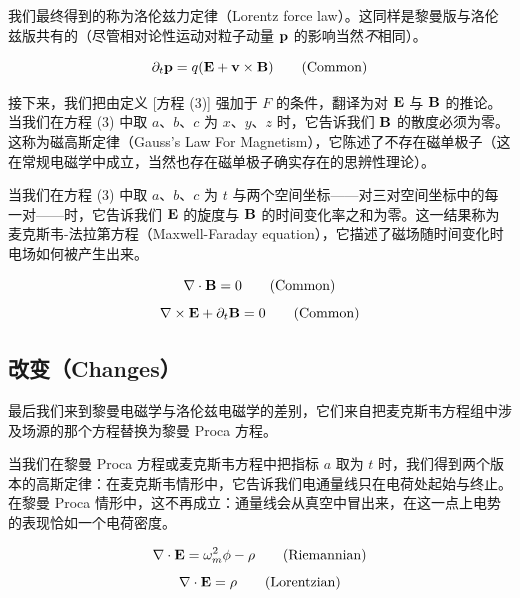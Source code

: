我们最终得到的称为洛伦兹力定律（Lorentz force law）。这同样是黎曼版与洛伦兹版共有的（尽管相对论性运动对粒子动量 $\mathbf{p}$ 的影响当然\emph{不}相同）。

\begin{keybox}[洛伦兹力定律]
\begin{equation}
\partial_{t}\mathbf{p} = q(\mathbf{E} + \mathbf{v}\times\mathbf{B}) \tag{Common}
\end{equation}
\end{keybox}

接下来，我们把由定义 [方程 (3)] 强加于 $F$ 的条件，翻译为对 $\mathbf{E}$ 与 $\mathbf{B}$ 的推论。当我们在方程 (3) 中取 $a$、$b$、$c$ 为 $x$、$y$、$z$ 时，它告诉我们 $\mathbf{B}$ 的散度必须为零。这称为磁高斯定律（Gauss's Law For Magnetism），它陈述了不存在磁单极子（这在常规电磁学中成立，当然也存在磁单极子确实存在的思辨性理论）。

当我们在方程 (3) 中取 $a$、$b$、$c$ 为 $t$ 与两个空间坐标——对三对空间坐标中的每一对——时，它告诉我们 $\mathbf{E}$ 的旋度与 $\mathbf{B}$ 的时间变化率之和为零。这一结果称为麦克斯韦-法拉第方程（Maxwell-Faraday equation），它描述了磁场随时间变化时电场如何被产生出来。

\begin{keybox}
\begin{equation}
\nabla\cdot\mathbf{B} = 0 \tag{Common}
\end{equation}
\begin{equation}
\nabla\times\mathbf{E} + \partial_{t}\mathbf{B} = 0 \tag{Common}
\end{equation}
\end{keybox}

\subsection{改变（Changes）}

最后我们来到黎曼电磁学与洛伦兹电磁学的差别，它们来自把麦克斯韦方程组中涉及场源的那个方程替换为黎曼 Proca 方程。

当我们在黎曼 Proca 方程或麦克斯韦方程中把指标 $a$ 取为 $t$ 时，我们得到两个版本的高斯定律：在麦克斯韦情形中，它告诉我们电通量线只在电荷处起始与终止。在黎曼 Proca 情形中，这不再成立：通量线会从真空中冒出来，在这一点上电势的表现恰如一个电荷密度。

\begin{keybox}[高斯定律]
\begin{equation}
\nabla\cdot\mathbf{E} = \omega_m^{2}\phi - \rho \tag{Riemannian}
\end{equation}
\begin{equation}
\nabla\cdot\mathbf{E} = \rho \tag{Lorentzian}
\end{equation}
\end{keybox}

